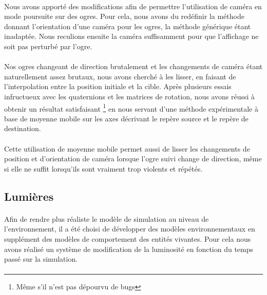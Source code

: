 \paragraph{}
Nous avons apporté des modifications afin de permettre l'utilisation de caméra
en mode poursuite sur des ogres. Pour cela, nous avons du redéfinir la méthode
donnant l'orientation d'une caméra pour les ogres, la méthode générique étant
inadaptée. Nous reculions ensuite la caméra suffisamment pour que l'affichage ne
soit pas perturbé par l'ogre.

\paragraph{}
Nos ogres changeant de direction brutalement et les changements de caméra étant
naturellement assez brutaux, nous avons cherché à les lisser, en faisant de
l'interpolation entre la position initiale et la cible. Après plusieurs essais
infructueux avec les quaternions et les matrices de rotation, nous avons réussi
à obtenir un résultat satisfaisant \footnote{Même s'il n'est pas dépourvu de
bugs} en nous servant d'une méthode expérimentale à base de moyenne mobile sur
les axes décrivant le repère source et le repère de destination.

\paragraph{}
Cette utilisation de moyenne mobile permet aussi de lisser les changements de
position et d'orientation de caméra lorsque l'ogre suivi change de direction,
même si elle ne suffit lorsqu'ils sont vraiment trop violents et répétés.

\subsection{Lumières}
\paragraph{}
Afin de rendre plus réaliste le modèle de simulation au niveau de
l'environnement, il a été choisi de développer des modèles environnementaux en
supplément des modèles de comportement des entités vivantes. Pour cela nous
avons réalisé un système de modification de la luminosité en fonction du temps
passé sur la simulation.

\paragraph{}

